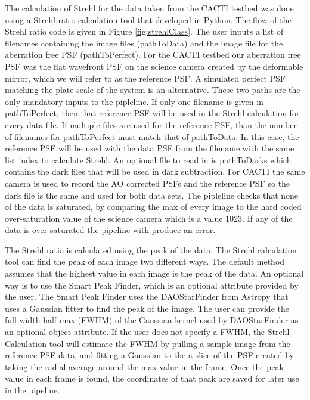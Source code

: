 \documentclass[12pt]{spieman}  %
\begin{document}
\begin{spacing}{2}
The calculation of Strehl for the data taken from the CACTI testbed was done using a Strehl ratio calculation tool that developed in Python. The flow of the Strehl ratio code is given in Figure \ref{fig:strehlClass}. The user inputs a list of filenames containing the image files (pathToData) and the image file for the aberration free PSF (pathToPerfect). For the CACTI testbed our aberration free PSF was the flat wavefront PSF on the science camera created by the deformable mirror, which we will refer to as the reference PSF. A simulated perfect PSF matching the plate scale of the system is an alternative. These two paths are the only mandatory inputs to the pipleline. If only one filename is given in pathToPerfect, then that reference PSF will be used in the Strehl calculation for every data file. If multiple files are used for the reference PSF, than the number of filenames for pathToPerfect must match that of pathToData. In this case, the reference PSF will be used with the data PSF from the filename with the same list index to calculate Strehl. An optional file to read in is pathToDarks which contains the dark files that will be used in dark subtraction. For CACTI the same camera is used to record the AO corrected PSFs and the reference PSF so the dark file is the same and used for both data sets. The pipleline checks that none of the data is saturated, by comparing the max of every image to the hard coded over-saturation value of the science camera which is a value 1023. If any of the data is over-saturated the pipeline with produce an error.

The Strehl ratio is calculated using the peak of the data. The Strehl calculation tool can find the peak of each image two different ways. The default method assumes that the highest value in each image is the peak of the data. An optional way is to use the Smart Peak Finder, which is an optional attribute provided by the user. The Smart Peak Finder uses the DAOStarFinder from Astropy that uses a Gaussian fitter to find the peak of the image. The user can provide the full-width half-max (FWHM) of the Gaussian kernel used by DAOStarFinder as an optional object attribute. If the user does not specify a FWHM, the Strehl Calculation tool will estimate the FWHM by pulling a sample image from the reference PSF data, and fitting a Gaussian to the a slice of the PSF created by taking the radial average around the max value in the frame. Once the peak value in each frame is found, the coordinates of that peak are saved for later use in the pipeline. 


\end{spacing}
\end{document}
